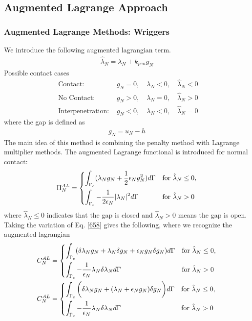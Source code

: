 \documentclass[12pt,3p]{article}
\begin{document}
\subsection{Augmented Lagrange Approach}

\subsubsection{Augmented Lagrange Methods: Wriggers}
We introduce the following augmented lagrangian term.
\begin{align*}
\hat{\lambda}_N = \lambda_N + k_{pen} g_N
\end{align*}
Possible contact cases
\begin{equation}
\begin{aligned}
\text { Contact: } & g_N = 0, \quad \lambda_N < 0, \quad \hat{\lambda}_N < 0 \\
\text { No Contact: } & g_N > 0, \quad \lambda_N = 0, \quad \hat{\lambda}_N > 0 \\
\text { Interpenetration: } & g_N < 0, \quad \lambda_N < 0, \quad \hat{\lambda}_N = 0 
\end{aligned}
\end{equation}
where the gap is defined as 
\begin{align*}
g_N = u_N - h
\end{align*}
The main idea of this method is combining the penalty method with Lagrange multiplier methods. The augmented Lagrange functional is introduced for normal contact: 
\begin{align}\label{658}
\Pi_{N}^{AL} = 
\begin{dcases}
    \int_{\Gamma_c} (\lambda_N g_N + \frac{1}{2} \epsilon_N g_N^2) d \Gamma & \text{for } \hat{\lambda}_N \leq 0, \\
    \int_{\Gamma_c} -\frac{1}{2 \epsilon_N} |\lambda_N|^2 d \Gamma               & \text{for } \hat{\lambda}_N > 0
\end{dcases}
\end{align}
where $ \hat{\lambda}_N \leq 0$ indicates that the gap is closed and $\hat{\lambda}_N > 0$ means the gap is open. 
Taking the variation of Eq. \ref{658} gives the following, where we recognize the augmented lagrangian 
\begin{align*}
C_{N}^{AL} &= 
\begin{dcases}
    \int_{\Gamma_c} (\delta \lambda_N g_N + \lambda_N \delta g_N + \epsilon_N g_N \delta g_N) d \Gamma & \text{for } \hat{\lambda}_N \leq 0, \\
    \int_{\Gamma_c} -\frac{1}{\epsilon_N} \lambda_N \delta \lambda_N d \Gamma               & \text{for } \hat{\lambda}_N > 0
\end{dcases} \\
C_{N}^{AL} &= 
\begin{dcases}
    \int_{\Gamma_c} \bigg( \delta \lambda_N g_N + (\lambda_N + \epsilon_N g_N) \delta g_N \bigg) d \Gamma & \text{for } \hat{\lambda}_N \leq 0, \\
    \int_{\Gamma_c} -\frac{1}{\epsilon_N} \lambda_N \delta \lambda_N d \Gamma               & \text{for } \hat{\lambda}_N > 0
\end{dcases} 
\end{align*}
\end{document}
